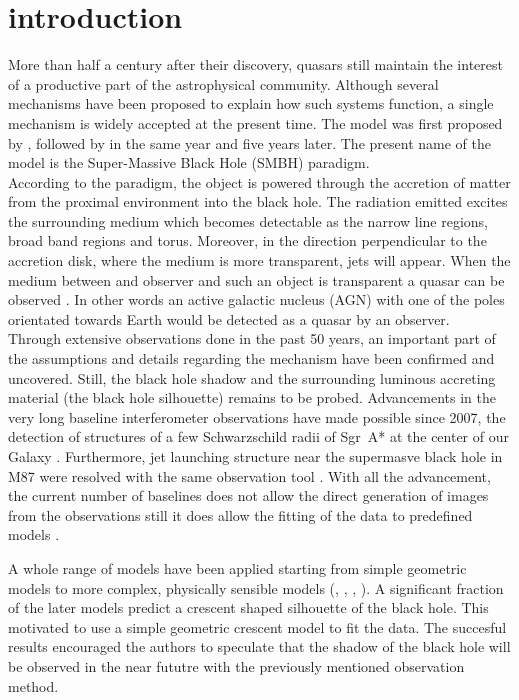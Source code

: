 \section{introduction}
More than half a century after their discovery, quasars still maintain the interest of a productive part of the astrophysical community. 
Although several mechanisms have been proposed to explain how such systems function, a single mechanism is widely accepted at the present time. 
The model was first proposed by \cite{1964ApJ...140..796S}, followed by \cite{1964SPhD....9..246Z} in the same year and \cite{1969Natur.223..690L} five years later.
The present name of the model is the Super-Massive Black Hole (SMBH) paradigm.\\

According to the paradigm, the object is powered through the accretion of matter from the proximal environment into the black hole. 
The radiation emitted excites the surrounding medium which becomes detectable as the narrow line regions, broad band regions and torus. 
Moreover, in the direction perpendicular to the accretion disk, where the medium is more transparent, jets will appear.
When the medium between and observer and such an object is transparent a quasar can be observed \citep[e.g.,][]{1984RvMP...56..255B}. 
In other words an active galactic nucleus (AGN) with one of the poles orientated towards Earth would be detected as a quasar by an observer. \\

Through extensive observations done in the past 50 years, an important part of the assumptions and details  regarding the mechanism have been confirmed and uncovered. 
Still, the black hole shadow and the surrounding luminous accreting material (the black hole silhouette) remains to be probed. 
Advancements in the very long baseline interferometer observations have made possible since 2007, the detection of structures of a few Schwarzschild radii of Sgr~A* at the center of our Galaxy \citep{2008JPhCS.131a2055D}. 
Furthermore, jet launching structure near the supermasve black hole in M87 were resolved with the same observation tool \citep{2012Sci...338..355D}.
With all the advancement, the current number of baselines does not allow the direct generation of images from the observations still it does allow the fitting of the data to predefined models \citep{2013MNRAS.434..765K}.


A whole range of models have been applied starting from simple geometric models to more complex, physically sensible models (\citep{2008Natur.455...78D}, \citep{2011ApJ...738...38B}, \citep{2009ApJ...706..497M}, \citep{2010ApJ...717.1092D}). 
A significant fraction of the later models predict a crescent shaped silhouette of the black hole. 
This motivated \cite{2013MNRAS.434..765K} to use a simple geometric crescent model to fit the data. 
The succesful results encouraged the authors to speculate that the shadow of the black hole will be observed in the near fututre with the previously mentioned observation method. \\


